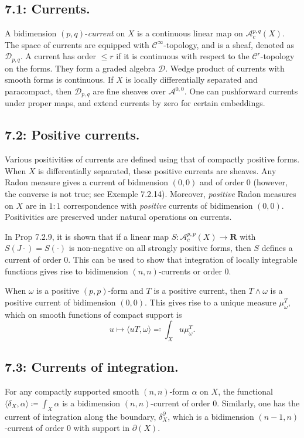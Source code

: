 \documentclass[12pt,reqno]{amsart}
\theoremstyle{definition}
\theoremstyle{remark}
\theoremstyle{citedrem}
\theoremstyle{cited}
\theoremstyle{citeddef}
\theoremstyle{step}
\begin{document}
\subsection*{7.1: Currents. } A bidimension $(p,q)$-\emph{current} on $X$ is a continuous linear map on $\mathcal{A}^{p,q}_c(X)$. The space of currents are equipped with $\mathcal{C}^\infty$-topology, and is a sheaf, denoted as $\mathcal{D}_{p,q}$. A current has order $\leq r$ if it is continuous with respect to the $\mathcal{C}^r$-topology on the forms. They form a graded algebra $\mathcal{D}$. Wedge product of currents with smooth forms is continuous. If $X$ is locally differentially separated and paracompact, then $\mathcal{D}_{p,q}$ are fine sheaves over $\mathcal{A}^{0,0}$. One can pushforward currents under proper maps, and extend currents by zero for certain embeddings. 

\subsection*{7.2: Positive currents. }Various positivities of currents are defined using that of compactly positive forms. When $X$ is differentially separated, these positive currents are sheaves. Any Radon measure gives a current of bidmension $(0,0)$ and of order $0$ (however, the converse is not true; see Exemple 7.2.14). Moreover, \emph{positive} Radon measures on $X$ are in $1:1$ correspondence with \emph{positive} currents of bidimension $(0,0)$. Positivities are preserved under natural operations on currents. 

In Prop 7.2.9, it is shown that if a linear map $S \colon \mathcal{A}^{p,p}_c(X) \to \mathbf{R}$ with $S(J \cdot ) = S(\cdot)$ is non-negative on all strongly positive forms, then $S$ defines a current of order $0$. This can be used to show that integration of locally integrable functions gives rise to bidimension $(n,n)$-currents or order $0$.

When $\omega$ is a positive $(p,p)$-form and $T$ is a positive current, then $T \wedge \omega$ is a positive current of bidimension $(0,0)$. This gives rise to a unique measure $\mu^T_\omega$, which on smooth functions of compact support is \[u \mapsto \langle uT, \omega \rangle \eqqcolon \int_X u \mu^T_\omega.\]
\subsection*{7.3: Currents of integration. }For any compactly supported smooth $(n,n)$-form $\alpha$ on $X$, the functional $\langle \delta_X, \alpha\rangle \coloneq \int_X \alpha$ is a bidimension $(n,n)$-current of order $0$. Similarly, one has the current of integration along the boundary, $\delta_X^\partial$, which is a bidimension $(n-1,n)$-current of order $0$ with support in $\partial(X)$. 
\end{document}

